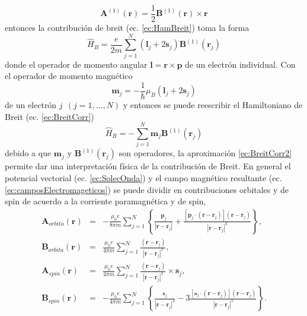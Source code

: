 \documentclass[12pt,a4paper, oneside]{book}
\begin{document}
     \begin{equation}
     	\pmb{A}^{(1)} (\pmb{r}) = \frac{1}{2} \pmb{B}^{(1)} (\pmb{r}) \times \pmb{r} \label{ec:Aaprox}
     \end{equation}
    entonces la contribuci\'on de breit (ec. \ref{ec:HamBreit}) toma la forma
    \begin{equation}
    \hat{H}_B = \frac{e}{2m} \sum_{j=1}^N (\pmb{l}_j + 2 \pmb{s}_j) \pmb{B}^{(1)} (\pmb{r}_j) \label{ec:BreitCorr}
    \end{equation}
    donde el operador de momento angular $\pmb{l}= \pmb{r} \times \pmb{p}$ de un electr\'on  individual. Con el operador de momento magn\'etico
    \begin{equation}
    \pmb{m}_j = - \frac{1}{\hbar} \mu_{B} (\pmb{l}_j + 2 \pmb{s}_j) \label{ec:opMagn}
    \end{equation}
    de un electr\'on $j ~~(j=1,...,N)$ y entonces se puede reescribir el Hamiltoniano de Breit (ec. \ref{ec:BreitCorr}) 
    \begin{equation}
    \hat{H}_B = -\sum_{j=1}^N \pmb{m}_j \pmb{B}^{(1)} (\pmb{r}_j) \label{ec:BreitCorr2}
    \end{equation} 
    debido a que $\pmb{m}_j$ y $\pmb{B}^{(1)} (\pmb{r}_j)$ son operadores, la aproximaci\'on \ref{ec:BreitCorr2} permite dar una interpretaci\'on f\'isica de la contribuci\'on de Breit.
    \newline
    En general el potencial vectorial (ec. \ref{ec:SolecOnda}) y el campo magn\'etico resultante (ec. \ref{ec:camposElectromageticos}) se puede dividir en contribuciones orbitales y de spin de acuerdo a la corriente paramagn\'etica y de spin,
    \begin{eqnarray}
    \pmb{A}_{orbita} (\pmb{r}) &=&- \frac{\mu_0 e}{8 \pi m} \sum_{j=1}^N \left\{\frac{\pmb{p}_j}{|\pmb{r}-\pmb{r}_j|} + \frac{[\pmb{p}_j \cdot (\pmb{r}-\pmb{r}_j)](\pmb{r}-\pmb{r}_j)}{|\pmb{r}-\pmb{r}_j|^3} \right\}, \nonumber \\
    \pmb{B}_{orbita} (\pmb{r}) &=& \frac{\mu_0 e}{4 \pi m} \sum_{j=1}^N \frac{(\pmb{r}-\pmb{r}_j)}{|\pmb{r}-\pmb{r}_j|^3}, \nonumber \\
    \pmb{A}_{spin} (\pmb{r}) &=& \frac{\mu_0 e}{4 \pi m} \sum_{j=1}^N \frac{(\pmb{r}-\pmb{r}_j)}{|\pmb{r}-\pmb{r}_j|^3} \times \pmb{s}_j, \\
    \pmb{B}_{spin} (\pmb{r}) &=&- \frac{\mu_0 e}{4 \pi m} \sum_{j=1}^N \left\{\frac{\pmb{s}_j}{|\pmb{r}-\pmb{r}_j|^3} -3 \frac{[\pmb{s}_j \cdot (\pmb{r}-\pmb{r}_j)](\pmb{r}-\pmb{r}_j)}{|\pmb{r}-\pmb{r}_j|^5} \right\}. \nonumber 
    \end{eqnarray} 
\end{document}
